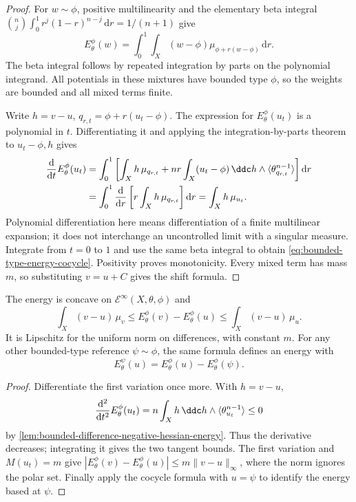 \begin{proof}
For $w\sim\phi$, positive multilinearity and the elementary beta integral
$\binom nj\int_0^1r^j(1-r)^{n-j}\,\mathrm dr=1/(n+1)$ give
\[
 E_\theta^\phi(w)=\int_0^1\int_X(w-\phi)
                              \mu_{\phi+r(w-\phi)}\,\mathrm dr.
\]
The beta integral follows by repeated integration by parts on the polynomial integrand. All potentials in these mixtures have bounded type $\phi$, so the weights are bounded and all mixed terms finite.

Write $h=v-u$, $q_{r,t}=\phi+r(u_t-\phi)$. The expression for $E_\theta^\phi(u_t)$ is a polynomial in $t$. Differentiating it and applying the integration-by-parts theorem to $u_t-\phi,h$ gives
\[
 \begin{split}
 \frac{\mathrm d}{\mathrm dt}E_\theta^\phi(u_t)
  &=\int_0^1\left[\int_Xh\,\mu_{q_{r,t}}
       +nr\int_X(u_t-\phi)\,\ddc h\wedge
                                      \langle\theta_{q_{r,t}}^{n-1}\rangle\right]\mathrm dr\\
  &=\int_0^1\frac{\mathrm d}{\mathrm dr}
                         \left[r\int_Xh\,\mu_{q_{r,t}}\right]\mathrm dr
   =\int_Xh\,\mu_{u_t}.
 \end{split}
\]
Polynomial differentiation here means differentiation of a finite multilinear expansion; it does not interchange an uncontrolled limit with a singular measure. Integrate from $t=0$ to $1$ and use the same beta integral to obtain \eqref{eq:bounded-type-energy-cocycle}. Positivity proves monotonicity. Every mixed term has mass $m$, so substituting $v=u+C$ gives the shift formula.
\end{proof}

\begin{proposition}\label{prop:bounded-type-energy-concavity}
The energy is concave on $\mathcal E^\infty(X,\theta,\phi)$ and
\begin{equation}\label{eq:bounded-type-energy-tangent-bounds}
 \int_X(v-u)\,\mu_v
       \leq E_\theta^\phi(v)-E_\theta^\phi(u)
       \leq\int_X(v-u)\,\mu_u.
\end{equation}
It is Lipschitz for the uniform norm on differences, with constant $m$. For any other bounded-type reference $\psi\sim\phi$, the same formula defines an energy with
\[
 E_\theta^\psi(u)=E_\theta^\phi(u)-E_\theta^\phi(\psi).
\]
\end{proposition}
\begin{proof}
Differentiate the first variation once more. With $h=v-u$,
\[
 \frac{\mathrm d^2}{\mathrm dt^2}E_\theta^\phi(u_t)
         =n\int_Xh\,\ddc h\wedge
                               \langle\theta_{u_t}^{n-1}\rangle\leq0
\]
by \cref{lem:bounded-difference-negative-hessian-energy}. Thus the derivative decreases; integrating it gives the two tangent bounds. The first variation and $M(u_t)=m$ give
$|E_\theta^\phi(v)-E_\theta^\phi(u)|\leq m\|v-u\|_\infty$, where the norm ignores the polar set. Finally apply the cocycle formula with $u=\psi$ to identify the energy based at $\psi$.
\end{proof}

